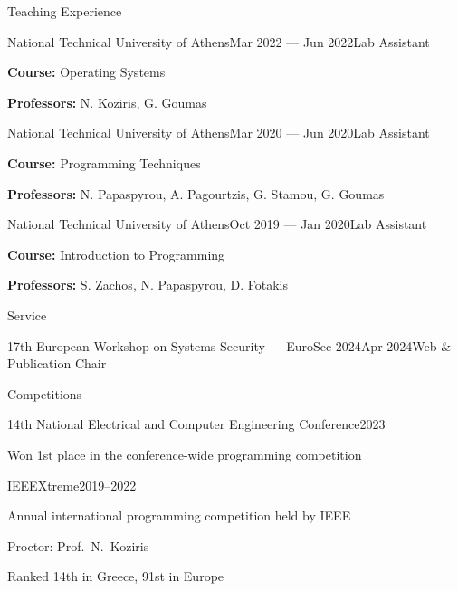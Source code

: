 \documentclass[letterpaper, 11pt]{resume}
\begin{document}
\begin{rSection}{Teaching Experience}
    \begin{rSubsection}{National Technical University of Athens}{Mar 2022 --- Jun 2022}{Lab Assistant}{}
        \item \textbf{Course:} Operating Systems
        \item \textbf{Professors:} N. Koziris, G. Goumas
    \end{rSubsection}
    \begin{rSubsection}{National Technical University of Athens}{Mar 2020 --- Jun 2020}{Lab Assistant}{}
        \item \textbf{Course:} Programming Techniques
        \item \textbf{Professors:} N. Papaspyrou, A. Pagourtzis, G. Stamou, G. Goumas
    \end{rSubsection}
    \begin{rSubsection}{National Technical University of Athens}{Oct 2019 --- Jan 2020}{Lab Assistant}{}
        \item \textbf{Course:} Introduction to Programming
        \item \textbf{Professors:} S. Zachos, N. Papaspyrou, D. Fotakis
    \end{rSubsection}
\end{rSection}



\begin{rSection}{Service}
    \begin{rSubsection}{17th European Workshop on Systems Security --- EuroSec 2024}{Apr 2024}{Web \& Publication Chair}{}
        \item[]
    \end{rSubsection}
    \vspace{-4ex}
\end{rSection}

\begin{rSection}{Competitions}
    \begin{rSubsection}{14th National Electrical and Computer Engineering Conference}{2023}{}{}
        \item Won 1st place in the conference-wide programming competition
    \end{rSubsection}

    \begin{rSubsection}{IEEEXtreme}{2019--2022}{}{}
        \item Annual international programming competition held by IEEE
        \item Proctor: Prof.\ N.\ Koziris
        \item Ranked 14th in Greece, 91st in Europe
    \end{rSubsection}
\end{rSection}
\end{document}

